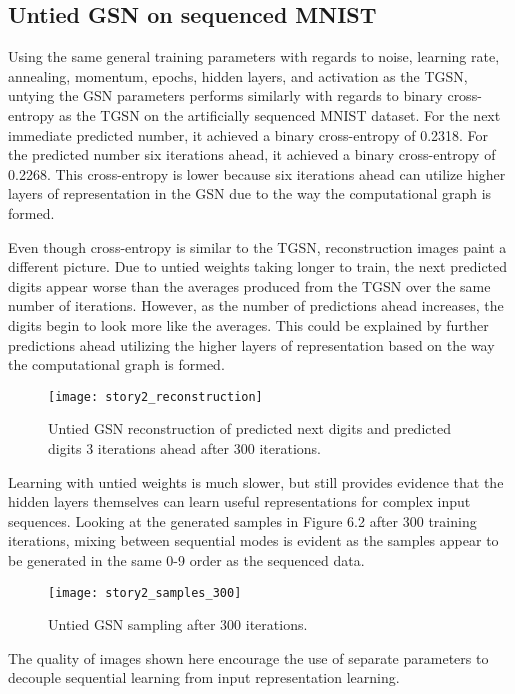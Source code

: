 \subsection{Untied GSN on sequenced MNIST}

Using the same general training parameters with regards to noise, learning rate, annealing, momentum, epochs, hidden layers, and activation as the TGSN, untying the GSN parameters performs similarly with regards to binary cross-entropy as the TGSN on the artificially sequenced MNIST dataset. For the next immediate predicted number, it achieved a binary cross-entropy of 0.2318.  For the predicted number six iterations ahead, it achieved a binary cross-entropy of 0.2268. This cross-entropy is lower because six iterations ahead can utilize higher layers of representation in the GSN due to the way the computational graph is formed.

Even though cross-entropy is similar to the TGSN, reconstruction images paint a different picture. Due to untied weights taking longer to train, the next predicted digits appear worse than the averages produced from the TGSN over the same number of iterations. However, as the number of predictions ahead increases, the digits begin to look more like the averages. This could be explained by further predictions ahead utilizing the higher layers of representation based on the way the computational graph is formed.

\begin{figure}[h!]
  \centering
    \texttt{[image: story2\_reconstruction]}
\caption{Untied GSN reconstruction of predicted next digits and predicted digits 3 iterations ahead after 300 iterations.}
\end{figure}

Learning with untied weights is much slower, but still provides evidence that the hidden layers themselves can learn useful representations for complex input sequences. Looking at the generated samples in Figure 6.2 after 300 training iterations, mixing between sequential modes is evident as the samples appear to be generated in the same 0-9 order as the sequenced data.

\begin{figure}[h!]
  \centering
    \texttt{[image: story2\_samples\_300]}
\caption{Untied GSN sampling after 300 iterations.}
\end{figure}

The quality of images shown here encourage the use of separate parameters to decouple sequential learning from input representation learning.

